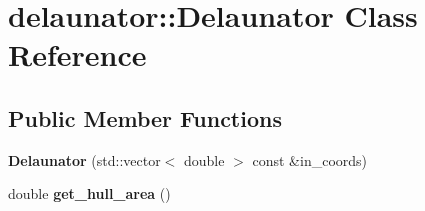 \hypertarget{classdelaunator_1_1Delaunator}{}\section{delaunator\+:\+:Delaunator Class Reference}
\label{classdelaunator_1_1Delaunator}
\subsection*{Public Member Functions}
\begin{DoxyCompactItemize}
\item 
\mbox{\label{classdelaunator_1_1Delaunator_a094e288531f1695ca64437f0c04128c8}} 
{\bfseries Delaunator} (std\+::vector$<$ double $>$ const \&in\+\_\+coords)
\item 
\mbox{\label{classdelaunator_1_1Delaunator_ae6ee753d08679728afd4b603eab7d1ab}} 
double {\bfseries get\+\_\+hull\+\_\+area} ()
\end{DoxyCompactItemize}
